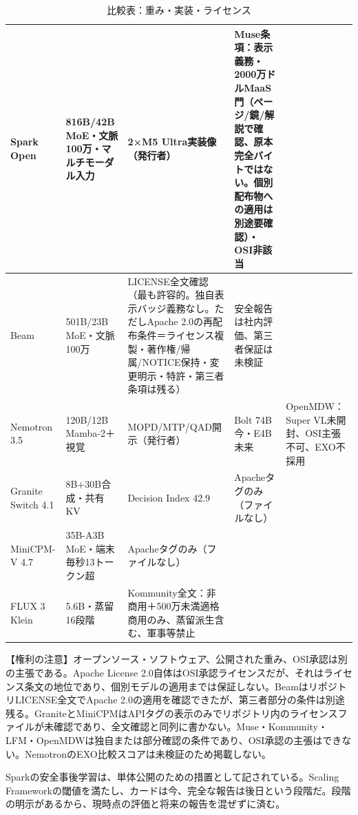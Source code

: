 \documentclass[lualatex,a4paper,10pt]{jlreq}
\begin{document}
\begin{table}[htbp]\centering\footnotesize
\caption{比較表：重み・実装・ライセンス}
\begin{tabularx}{0.96\linewidth}{@{}lXXXX@{}}
\toprule
Spark Open & 816B/42B MoE・文脈100万・マルチモーダル入力 & 2×M5 Ultra実装像（発行者） & Muse条項：表示義務・2000万ドルMaaS門（ページ/鏡/解説で確認、原本完全バイトではない。個別配布物への適用は別途要確認）・OSI非該当 \cite{B14,B70,B15,B13} \\
\midrule
Beam & 501B/23B MoE・文脈100万 & LICENSE全文確認（最も許容的。独自表示バッジ義務なし。ただしApache 2.0の再配布条件＝ライセンス複製・著作権/帰属/NOTICE保持・変更明示・特許・第三者条項は残る） & 安全報告は社内評価、第三者保証は未検証 \cite{B17,B19,B18,B16} \\
\midrule
Nemotron 3.5 & 120B/12B Mamba-2＋視覚 & MOPD/MTP/QAD開示（発行者） & Bolt 74B今・E4B未来 & OpenMDW：Super VL未開封、OSI主張不可、EXO不採用 \cite{B21,B72,B22,B20} \\
\midrule
Granite Switch 4.1 & 8B+30B合成・共有KV & Decision Index 42.9 & Apacheタグのみ（ファイルなし） \cite{B24,B73,B23,B25} \\
\midrule
MiniCPM-V 4.7 & 35B-A3B MoE・端末毎秒13トークン超 & Apacheタグのみ（ファイルなし） \cite{B27,B74,B26} \\
\midrule
FLUX 3 Klein & 5.6B・蒸留16段階 & Kommunity全文：非商用＋500万未満適格商用のみ、蒸留派生含む、軍事等禁止 \cite{B29,B28,B30} \\
\bottomrule
\end{tabularx}
\end{table}

\begin{tcolorbox}[colback=SurveySoft,colframe=SurveyRule,arc=1mm,boxrule=0.4pt,left=2mm,right=2mm]
【権利の注意】オープンソース・ソフトウェア、公開された重み、OSI承認は別の主張である。Apache License 2.0自体はOSI承認ライセンスだが、それはライセンス条文の地位であり、個別モデルの適用までは保証しない。BeamはリポジトリLICENSE全文でApache 2.0の適用を確認できたが、第三者部分の条件は別途残る。GraniteとMiniCPMはAPIタグの表示のみでリポジトリ内のライセンスファイルが未確認であり、全文確認と同列に書かない。Muse・Kommunity・LFM・OpenMDWは独自または部分確認の条件であり、OSI承認の主張はできない。NemotronのEXO比較スコアは未検証のため掲載しない。
\end{tcolorbox}
\cite{B14,B70,B15,B13,B71,B17,B19,B18,B16,B21,B72,B22,B20,B24,B73,B23,B25,B27,B74,B26,B29,B28,B30}

Sparkの安全事後学習は、単体公開のための措置として記されている。Scaling Frameworkの閾値を満たし、カードは今、完全な報告は後日という段階だ。段階の明示があるから、現時点の評価と将来の報告を混ぜずに済む。
\cite{B14,B70,B15,B13,B71}
\end{document}
